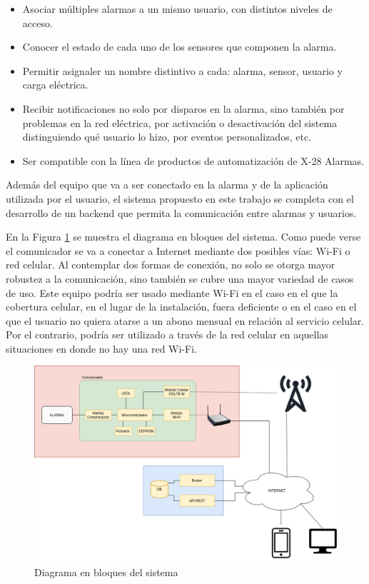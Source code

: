 \documentclass[
11pt, %
codirector, %
]{charter}
\begin{document}
\begin{itemize}
	\item Asociar múltiples alarmas a un mismo usuario, con distintos niveles de acceso.
	\item Conocer el estado de cada uno de los sensores que componen la alarma.
	\item Permitir asignaler un nombre distintivo a cada: alarma, sensor, usuario y carga eléctrica.
	\item Recibir notificaciones no solo por disparos en la alarma, sino también por problemas en la red eléctrica, por activación o desactivación del sistema distinguiendo qué usuario lo hizo, por eventos personalizados, etc.
	\item Ser compatible con la línea de productos de automatización de X-28 Alarmas.
\end{itemize}

Además del equipo que va a ser conectado en la alarma y de la aplicación utilizada por el usuario, el sistema propuesto en este trabajo se completa con el desarrollo de un backend que permita la comunicación entre alarmas y usuarios. 

En la Figura \ref{fig:diagBloques} se muestra el diagrama en bloques del sistema. Como puede verse el comunicador se va a conectar a Internet mediante dos posibles vías: Wi-Fi o red celular. Al contemplar dos formas de conexión, no solo se otorga mayor robustez a la comunicación, sino también se cubre una mayor variedad de casos de uso. Este equipo podría ser usado mediante Wi-Fi en el caso en el que la cobertura celular, en el lugar de la instalación, fuera deficiente o en el caso en el que el usuario no quiera atarse a un abono mensual en relación al servicio celular. Por el contrario, podría ser utilizado a través de la red celular en aquellas situaciones en donde no hay una red Wi-Fi.


\begin{figure}[htpb]
\centering 
\includegraphics[width=\textwidth]{./Figuras/diagBloques.png}
\caption{Diagrama en bloques del sistema}
\label{fig:diagBloques}
\end{figure}
\end{document}
